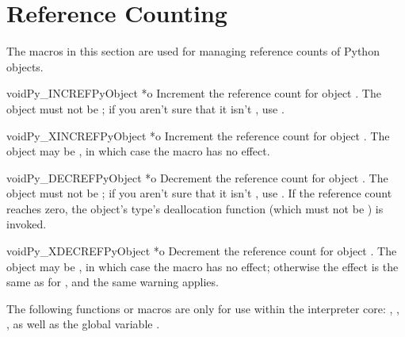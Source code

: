 \chapter{Reference Counting \label{countingRefs}}


The macros in this section are used for managing reference counts
of Python objects.


\begin{cfuncdesc}{void}{Py_INCREF}{PyObject *o}
  Increment the reference count for object .  The object must
  not be \NULL; if you aren't sure that it isn't \NULL, use
  .
\end{cfuncdesc}

\begin{cfuncdesc}{void}{Py_XINCREF}{PyObject *o}
  Increment the reference count for object .  The object may be
  \NULL, in which case the macro has no effect.
\end{cfuncdesc}

\begin{cfuncdesc}{void}{Py_DECREF}{PyObject *o}
  Decrement the reference count for object .  The object must
  not be \NULL; if you aren't sure that it isn't \NULL, use
  .  If the reference count reaches zero, the
  object's type's deallocation function (which must not be \NULL) is
  invoked.

\end{cfuncdesc}

\begin{cfuncdesc}{void}{Py_XDECREF}{PyObject *o}
  Decrement the reference count for object .  The object may be
  \NULL, in which case the macro has no effect; otherwise the effect
  is the same as for , and the same warning
  applies.
\end{cfuncdesc}

The following functions or macros are only for use within the
interpreter core: ,
, , as
well as the global variable .
